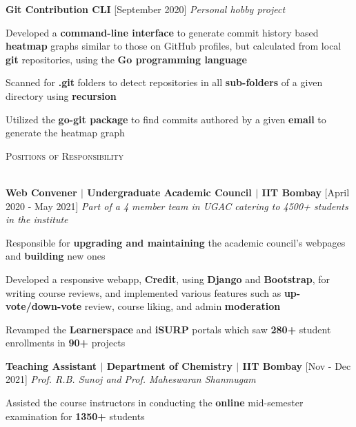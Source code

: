 \documentclass[11pt]{article}
\renewcommand{\section}[1]{
    \vspace*{8pt}
    \textsc{\LARGE{#1}}
    \vspace*{-10pt} \\ \hspace*{-5pt} 
    \hrulefill \\
    \vspace*{-15pt}
    \vspace*{-8pt}
}
\newcommand{\smallbullet}{
    \small$\bullet$
}
\newcommand{\bigblock}[3]{
    {
        \vspace*{5pt}
        \hspace*{-8pt} \large{\textbf{#1}} \hfill #2 \newline
        \textit{\textsf{#3}}
    }
}
\newenvironment{bullet-list-minor}{
    \begin{list}{
        \smallbullet
    }{
        \setlength\leftmargin{30pt}\topsep -5pt \itemsep -6pt
    }
} {
    \end{list}
}
\begin{document}
    \bigblock{
        Git Contribution CLI
    }{
        [September 2020]
    }{
        Personal hobby project
    }
	\begin{bullet-list-minor}
        \item Developed a \textbf{command-line interface} to generate commit history based \textbf{heatmap} graphs similar to those on GitHub profiles, but calculated from local \textbf{git} repositories, using the \textbf{Go programming language}
        \item Scanned for \textbf{.git} folders to detect repositories in all \textbf{sub-folders} of a given directory using \textbf{recursion}
        \item Utilized the \textbf{go-git package} to find commits authored by a given \textbf{email} to generate the heatmap graph
    \end{bullet-list-minor}


    \section{Positions of Responsibility}

    \bigblock{
        Web Convener \(|\) Undergraduate Academic Council \(|\) IIT Bombay
    }{
        [April 2020 - May 2021]
    }{
        Part of a 4 member team in UGAC catering to 4500+ students in the institute
    }
    \begin{bullet-list-minor}
        \item Responsible for \textbf{upgrading and maintaining} the academic council's webpages and \textbf{building} new ones
        \item Developed a responsive webapp, \textbf{Credit}, using \textbf{Django} and \textbf{Bootstrap}, for writing course reviews, and implemented various features such as \textbf{up-vote/down-vote} review, course liking, and admin \textbf{moderation}
        \item Revamped the \textbf{Learnerspace} and \textbf{iSURP} portals which saw \textbf{280+} student enrollments in \textbf{90+} projects
    \end{bullet-list-minor}

    \bigblock{
        Teaching Assistant \(|\) Department of Chemistry \(|\) IIT Bombay
    }{
        [Nov - Dec 2021]
    }{
        Prof. R.B. Sunoj and Prof. Maheswaran Shanmugam
    }
    \begin{bullet-list-minor}
        \item Assisted the course instructors in conducting the \textbf{online} mid-semester examination for
        \textbf{1350+} students
    \end{bullet-list-minor}
    
\end{document}
